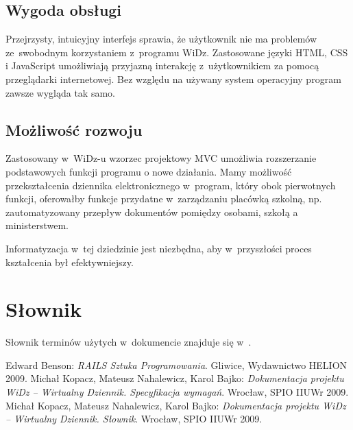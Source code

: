 \documentclass[12pt,leqno,twoside]{mwart}
\begin{document}
\subsection{Wygoda obsługi}
\noindent Przejrzysty, intuicyjny interfejs sprawia, że użytkownik nie ma problemów ze~swobodnym korzystaniem z~programu WiDz. Zastosowane języki HTML, CSS i JavaScript umożliwiają przyjazną interakcję z~użytkownikiem za pomocą przeglądarki internetowej. Bez względu na używany system operacyjny program zawsze wygląda tak samo.

\subsection{Możliwość rozwoju}
\noindent Zastosowany w~WiDz-u wzorzec projektowy MVC umożliwia rozszerzanie podstawowych funkcji programu o nowe działania. Mamy możliwość przekształcenia dziennika elektronicznego w~program, który obok pierwotnych funkcji, oferowałby funkcje przydatne w~zarządzaniu placówką szkolną, np. zautomatyzowany przepływ dokumentów pomiędzy osobami, szkołą a ministerstwem.

\indent Informatyzacja w~tej dziedzinie jest niezbędna, aby w~przyszłości proces kształcenia był efektywniejszy.

\section{Słownik}
\noindent Słownik terminów użytych w~dokumencie znajduje się w~\cite{SLO}.

\begin{thebibliography}{99}
 Edward Benson: {\it RAILS Sztuka Programowania}. Gliwice, Wydawnictwo HELION 2009.
 Michał Kopacz, Mateusz Nahalewicz, Karol Bajko: {\it Dokumentacja projektu WiDz -- Wirtualny Dziennik. Specyfikacja wymagań}. Wrocław, SPIO IIUWr 2009.
 Michał Kopacz, Mateusz Nahalewicz, Karol Bajko: {\it Dokumentacja projektu WiDz -- Wirtualny Dziennik. Słownik}. Wrocław, SPIO IIUWr 2009.
\end{thebibliography}
\end{document}
